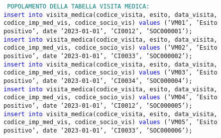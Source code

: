 \documentclass{article}
\begin{document}
    \begin{flushleft}
        \texttt{
        \textcolor{teal}{POPOLAMENTO DELLA TABELLA VISITA MEDICA:} \\
        \hspace*{0.5em}\textcolor{blue}{insert into} visita\_medica(codice\_visita, esito, data\_visita, codice\_imp\_med\_vis, \hspace*{0.5em}codice\_socio\_vis) \textcolor{blue}{values} ('VM01', 'Esito positivo', date '2023-01-01', 'CI0012', \hspace*{0.5em}'SOC000001'); \\
        \vspace{2mm}
        \hspace*{0.5em}\textcolor{blue}{insert into} visita\_medica(codice\_visita, esito, data\_visita, codice\_imp\_med\_vis, \hspace*{0.5em}codice\_socio\_vis) \textcolor{blue}{values} ('VM02', 'Esito positivo', date '2023-01-01', 'CI0033', \hspace*{0.5em}'SOC000002'); \\
        \vspace{2mm}
        \hspace*{0.5em}\textcolor{blue}{insert into} visita\_medica(codice\_visita, esito, data\_visita, codice\_imp\_med\_vis, \hspace*{0.5em}codice\_socio\_vis) \textcolor{blue}{values} ('VM03', 'Esito positivo', date '2023-01-01', 'CI0034', \hspace*{0.5em}'SOC000004'); \\
        \vspace{2mm}
        \hspace*{0.5em}\textcolor{blue}{insert into} visita\_medica(codice\_visita, esito, data\_visita, codice\_imp\_med\_vis, \hspace*{0.5em}codice\_socio\_vis) \textcolor{blue}{values} ('VM04', 'Esito positivo', date '2023-01-01', 'CI0012', \hspace*{0.5em}'SOC000005'); \\
        \vspace{2mm}
        \hspace*{0.5em}\textcolor{blue}{insert into} visita\_medica(codice\_visita, esito, data\_visita, codice\_imp\_med\_vis, \hspace*{0.5em}codice\_socio\_vis) \textcolor{blue}{values} ('VM05', 'Esito positivo', date '2023-01-01', 'CI0033', \hspace*{0.5em}'SOC000006'); \\
}
\end{flushleft}
\end{document}
